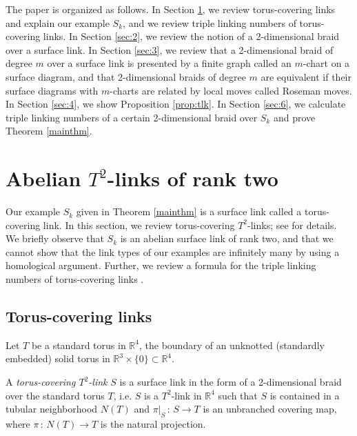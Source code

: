\documentclass[a4paper,11pt]{amsart}
\numberwithin{equation}{section}
\begin{document}
The paper is organized as follows. In Section \ref{sec:5}, we review torus-covering links and explain our example $S_k$, and we review triple linking numbers of torus-covering links. In Section \ref{sec:2}, we review the notion of a 2-dimensional braid over a surface link. 
In Section \ref{sec:3}, we review that a 2-dimensional braid of degree $m$ over a surface link is presented by a finite graph called an $m$-chart on a surface diagram, and that 2-dimensional braids of degree $m$ are equivalent if their surface diagrams with $m$-charts are related by local moves called Roseman moves. 
In Section \ref{sec:4}, we show Proposition \ref{prop:tlk}. 
In Section \ref{sec:6}, we calculate triple linking numbers of a certain 2-dimensional braid over $S_k$ and prove Theorem \ref{mainthm}.

\section{Abelian $T^2$-links of rank two}\label{sec:5}
Our example $S_k$ given in Theorem \ref{mainthm} is a surface link called a torus-covering link. 
In this section, we review torus-covering $T^2$-links; see \cite{N1} for details. 
We briefly observe that $S_k$ is an abelian surface link of rank two, and that we cannot show that the link types of our examples are infinitely many by using a homological argument. 
Further, we review a formula for the triple linking numbers of torus-covering links \cite{I-N}. 


\subsection{Torus-covering links}\label{sec:5-1}

Let $T$ be a standard torus in $\mathbb{R}^4$, the boundary of an unknotted (standardly embedded) solid torus in $\mathbb{R}^3 \times \{0\} \subset \mathbb{R}^4$. 

\begin{definition} \label{Def2-1} 
A {\it torus-covering $T^2$-link} $S$ is a surface link in the form of a 2-dimensional braid over the standard torus $T$, i.e. $S$ is a 
$T^{2}$-link in $\mathbb{R}^4$ 
such that $S$ is contained in a tubular neighborhood $N(T)$ and $\pi |_{S} \,:\, S \to T$ is an unbranched covering map, where $\pi \,:\, N(T) \to T$ is the natural projection. 
\end{definition} 
\end{document}
